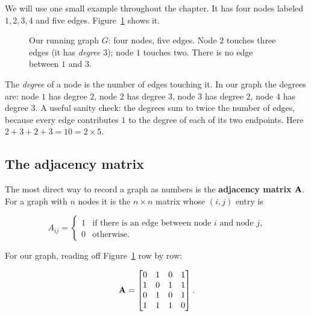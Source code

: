We will use one small example throughout the chapter. It has four nodes labeled
$1,2,3,4$ and five edges. Figure~\ref{ch35:fig-graph4} shows it.

\begin{figure}[H]
\centering
{}
\caption{Our running graph $G$: four nodes, five edges. Node $2$ touches three edges
(it has \emph{degree} $3$); node $1$ touches two. There is no edge between $1$ and $3$.}
\label{ch35:fig-graph4}
\end{figure}

The \emph{degree} of a node is the number of edges touching it. In our graph the degrees
are: node $1$ has degree $2$, node $2$ has degree $3$, node $3$ has degree $2$, node $4$
has degree $3$. A useful sanity check: the degrees sum to
twice the number of edges, because every edge contributes $1$ to the degree of each of its
two endpoints. Here $2+3+2+3 = 10 = 2 \times 5$.

\subsection{The adjacency matrix}
\label{ch35:adjacency}

The most direct way to record a graph as numbers is the \textbf{adjacency matrix} $\mathbf{A}$.
For a graph with $n$ nodes it is the $n \times n$ matrix whose $(i,j)$ entry is

\[
A_{ij} =
\begin{cases}
1 & \text{if there is an edge between node $i$ and node $j$,}\\
0 & \text{otherwise.}
\end{cases}
\]

For our graph, reading off Figure~\ref{ch35:fig-graph4} row by row:

\[
\mathbf{A} =
\begin{bmatrix}
0 & 1 & 0 & 1\\
1 & 0 & 1 & 1\\
0 & 1 & 0 & 1\\
1 & 1 & 1 & 0
\end{bmatrix}.
\]

